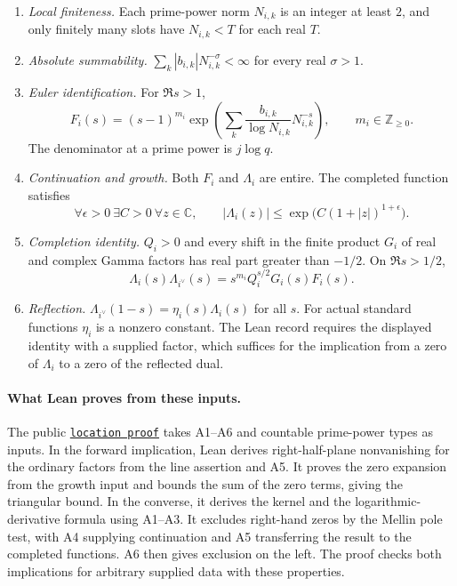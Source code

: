 \documentclass[11pt]{amsart}
\theoremstyle{definition}
\theoremstyle{remark}
\numberwithin{equation}{section}
\newcommand{\repositoryurl}{https://github.com/kimihiro64/Robin1984}
\newcommand{\proofrevision}{b359826e62c50b6cef55db4b2fcab793232498cc}
\newcommand{\codelink}[2]{%
  \href{\repositoryurl/blob/\proofrevision/#1}{\texttt{#2}}}
\begin{document}
\begin{enumerate}[label=\textup{(A\arabic*)},itemsep=.25em]
\item \emph{Local finiteness.} Each prime-power norm \(N_{i,k}\)
is an integer at least \(2\), and only finitely many slots have
\(N_{i,k}<T\) for each real \(T\).
\item \emph{Absolute summability.}
\(\sum_k |b_{i,k}|N_{i,k}^{-\sigma}<\infty\) for every
real \(\sigma>1\).
\item \emph{Euler identification.} For \(\Re s>1\),
\[
 F_i(s)=(s-1)^{m_i}
    \exp\left(\sum_k \frac{b_{i,k}}{\log N_{i,k}}N_{i,k}^{-s}\right),
 \qquad m_i\in\mathbb Z_{\ge0}.
\]
The denominator at a prime power is \(j\log q\).
\item \emph{Continuation and growth.} Both \(F_i\) and
\(\Lambda_i\) are entire. The completed function satisfies
\[
 \forall\epsilon>0\ \exists C>0\ \forall z\in\mathbb C,\qquad
 |\Lambda_i(z)|\leq \exp\!\bigl(C(1+|z|)^{1+\epsilon}\bigr).
\]
\item \emph{Completion identity.} \(Q_i>0\) and every shift
in the finite product \(G_i\) of real and complex Gamma factors
has real part greater than \(-1/2\). On \(\Re s>1/2\),
\[
 \Lambda_i(s)\Lambda_{i^\vee}(s)
      =s^{m_i}Q_i^{s/2}G_i(s)F_i(s).
\]
\item \emph{Reflection.}
\(\Lambda_{i^\vee}(1-s)=\eta_i(s)\Lambda_i(s)\) for all \(s\).
For actual standard functions \(\eta_i\) is a nonzero constant.
The Lean record requires the displayed identity with a supplied
factor, which suffices for the implication from a zero of
\(\Lambda_i\) to a zero of the reflected dual.
\end{enumerate}

\paragraph{What Lean proves from these inputs.}
The public \codelink{Solution.lean\#L93-L111}{location proof}
takes A1--A6 and countable prime-power types as inputs.
In the forward implication, Lean derives right-half-plane
nonvanishing for the ordinary factors from the line assertion
and A5. It proves the zero expansion from the growth input
and bounds the sum of the zero terms, giving the triangular
bound. In the converse, it derives the kernel and the
logarithmic-derivative formula using A1--A3. It excludes
right-hand zeros by the Mellin pole test, with A4 supplying
continuation and A5 transferring the result to the completed
functions. A6 then gives exclusion on the left. The proof
checks both implications for arbitrary supplied data with these
properties.
\end{document}
